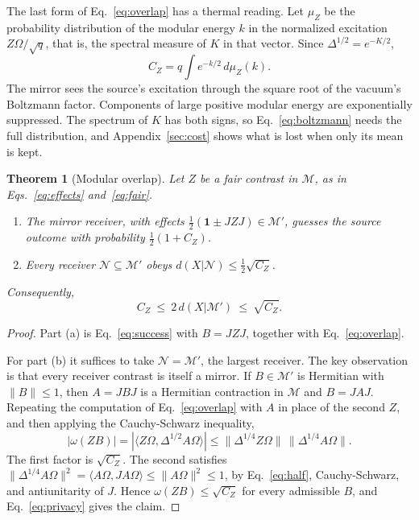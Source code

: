 \documentclass[11pt,a4paper]{article}
\providecommand{\openone}{\mathbf{1}}
\newtheorem{theorem}{Theorem}
\newcommand{\M}{\mathcal M}
\newcommand{\N}{\mathcal N}
\newcommand{\id}{\openone}
\begin{document}
The last form of Eq.~\eqref{eq:overlap} has a thermal reading. Let $\mu_Z$ be the probability distribution of the modular energy $k$ in the normalized excitation $Z\Omega/\sqrt q$, that is, the spectral measure of $K$ in that vector. Since $\Delta^{1/2}=e^{-K/2}$,
\begin{equation}
 C_Z=q\int e^{-k/2}\,d\mu_Z(k).
 \label{eq:boltzmann}
\end{equation}
The mirror sees the source's excitation through the square root of the vacuum's Boltzmann factor. Components of large positive modular energy are exponentially suppressed. The spectrum of $K$ has both signs, so Eq.~\eqref{eq:boltzmann} needs the full distribution, and Appendix~\ref{sec:cost} shows what is lost when only its mean is kept.

\begin{samepage}
\begin{theorem}[Modular overlap]
\label{thm:main}
Let $Z$ be a fair contrast in $\M$, as in Eqs.~\eqref{eq:effects} and~\eqref{eq:fair}.
\begin{enumerate}
\item[(a)] The mirror receiver, with effects $\tfrac12(\id\pm JZJ)\in\M'$, guesses the source outcome with probability $\tfrac12(1+C_Z)$.
\item[(b)] Every receiver $\N\subseteq\M'$ obeys $d(X|\N)\le\tfrac12\sqrt{C_Z}$.
\end{enumerate}
Consequently,
\begin{equation}
 C_Z\ \le\ 2\,d(X|\M')\ \le\ \sqrt{C_Z} .
 \label{eq:window}
\end{equation}
\end{theorem}
\end{samepage}

\begin{proof}
Part (a) is Eq.~\eqref{eq:success} with $B=JZJ$, together with Eq.~\eqref{eq:overlap}.

For part (b) it suffices to take $\N=\M'$, the largest receiver. The key observation is that every receiver contrast is itself a mirror. If $B\in\M'$ is Hermitian with $\|B\|\le1$, then $A=JBJ$ is a Hermitian contraction in $\M$ and $B=JAJ$. Repeating the computation of Eq.~\eqref{eq:overlap} with $A$ in place of the second $Z$, and then applying the Cauchy-Schwarz inequality,
\begin{equation}
 |\omega(ZB)|=|\langle Z\Omega,\Delta^{1/2}A\Omega\rangle|
 \le\|\Delta^{1/4}Z\Omega\|\,\|\Delta^{1/4}A\Omega\| .
\end{equation}
The first factor is $\sqrt{C_Z}$. The second satisfies $\|\Delta^{1/4}A\Omega\|^2=\langle A\Omega,JA\Omega\rangle\le\|A\Omega\|^2\le1$, by Eq.~\eqref{eq:half}, Cauchy-Schwarz, and antiunitarity of $J$. Hence $\omega(ZB)\le\sqrt{C_Z}$ for every admissible $B$, and Eq.~\eqref{eq:privacy} gives the claim.
\end{proof}
\end{document}

